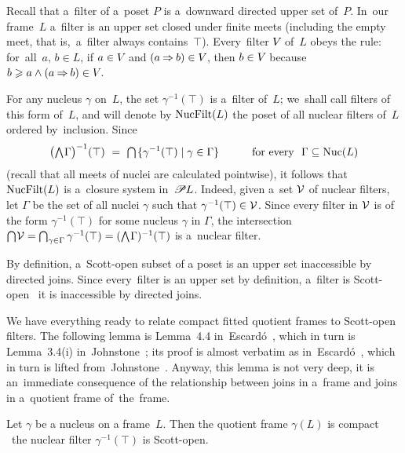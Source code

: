 \documentclass[11pt,letterpaper]{article}
\renewcommand{\thmskip}{\bigskip}
\begin{document}
Recall that a~filter of a~poset $P$ is a~downward directed upper set of~$P$.
In~our frame~$L$ a~filter is an upper set closed under finite meets
(including the empty meet, that is,~a~filter always contains~$\top$).
Every~filter $V\mspace{-2mu}$ of~$L$
obeys the  rule:
for~all~$a,\,b\in L$,
	if $a\in V\mspace{-2mu}$ and $(a\mathbin{\Rightarrow} b)\in V\mspace{-2mu}$,
	then $b\in V\mspace{-2mu}$ because $b \geqslant a\wedge(a\mathbin{\Rightarrow} b) \in V\mspace{-2mu}$.

For any nucleus $\gamma$ on~$L$,
the set $\gamma^{-1}(\top)$ is a~filter of~$L$;
we~shall call filters of this form  of~$L$,
and will denote by $\mathop{\smash{\mathrm{NucFilt}}}\nolimits(L)$
the poset of all nuclear filters of~$L$ ordered by~inclusion.
Since
%
\begin{equation*}
\bigl(\mathop{\textstyle\bigwedge}\nolimits\mspace{-2mu}\Gamma\bigr)^{-1}(\top)
    \mspace{2mu}\:=\:\mspace{2mu} \mathop{\textstyle\bigcap}\nolimits\mspace{2mu}\{ \gamma^{-1}(\top)\mid \gamma\in\Gamma \}
    \qquad\quad \text{for every \ $\Gamma\subseteq\mathop{\smash{\mathrm{Nuc}}}\nolimits(L)$}
\end{equation*}
%
(recall that all meets of nuclei are calculated pointwise),
it follows that $\mathop{\smash{\mathrm{NucFilt}}}\nolimits(L)$ is a~closure system in~$\mathscr{P}{\mspace{-1mu} L}\mspace{1mu}$.
Indeed, given a~set $\mathcal{V}$ of nuclear filters,
let $\Gamma$ be the set of all nuclei $\gamma$ such that $\gamma^{-1}(\top)\in\mathcal{V}$.
Since every filter in $\mathcal{V}$ is of the form $\gamma^{-1}(\top)$
for some nucleus $\gamma$ in $\Gamma$,
the intersection
$\bigcap\mspace{-2mu}\mathcal{V}
	= \bigcap_{\gamma\in\Gamma}\gamma^{-1}(\top)
	= (\bigwedge\mspace{-2mu}\Gamma)^{-1}(\top)$
is a~nuclear filter.

By definition, a~Scott-open subset of a poset is an upper set inaccessible by directed joins.
Since every~filter is an upper set by definition,
a~filter is Scott-open \iff\ it is inaccessible by directed joins.

\txtskip

We have everything ready to relate compact fitted quotient frames to Scott-open filters.
The following lemma is Lemma~4.4 in~Escard\'{o}~\cite{escardo},
which in turn is Lemma~3.4(i) in~Johnstone~\cite{johnstoneViet};
its proof is almost verbatim as in~Escard\'{o}~\cite{escardo},
which in turn is lifted from~Johnstone~\cite{johnstoneViet}.
Anyway, this lemma is not very deep,
it is an~immediate consequence
	of the relationship between joins in a~frame and joins in a~quotient frame of~the~frame.

\thmskip

\begin{lemma}\label{lem:compact-qr-vs-scottopen-nf}
Let\/ $\gamma$ be a nucleus on a frame\/~$L$.
Then the quotient frame\/ $\gamma(L)$ is compact
\iff\ the nuclear filter\/ $\gamma^{-1}(\top)$ is Scott-open.
\end{lemma}
\end{document}
